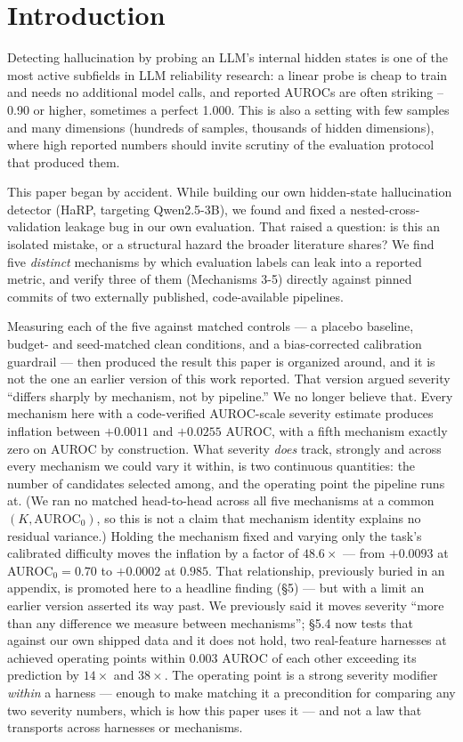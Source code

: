 \documentclass[10pt]{article} %
\begin{document}
\section{Introduction}

Detecting hallucination by probing an LLM's internal hidden states is one
of the most active subfields in LLM reliability research: a linear probe
is cheap to train and needs no additional model calls, and reported
AUROCs are often striking -- 0.90 or higher, sometimes a perfect 1.000.
This is also a setting with few samples and many dimensions (hundreds of
samples, thousands of hidden dimensions), where high reported numbers
should invite scrutiny of the evaluation protocol that produced them.

This paper began by accident. While building our own hidden-state
hallucination detector (HaRP, targeting Qwen2.5-3B), we found and fixed a
nested-cross-validation leakage bug in our own evaluation. That raised a
question: is this an isolated mistake, or a structural hazard the broader
literature shares? We find five \emph{distinct} mechanisms by which
evaluation labels can leak into a reported metric, and verify three of
them (Mechanisms 3-5) directly against pinned commits of two externally
published, code-available pipelines.

Measuring each of the five against matched controls --- a placebo baseline,
budget- and seed-matched clean conditions, and a bias-corrected calibration
guardrail --- then produced the result this paper is organized around, and it
is not the one an earlier version of this work reported. That version argued
severity ``differs sharply by mechanism, not by pipeline.'' We no longer
believe that. Every mechanism here with a code-verified AUROC-scale severity
estimate produces inflation between $+0.0011$ and $+0.0255$ AUROC, with a
fifth mechanism exactly zero on AUROC by construction. What severity
\emph{does} track, strongly and across every mechanism we could vary it
within, is two continuous quantities: the number of candidates selected among,
and the operating point the pipeline runs at. (We ran no matched head-to-head
across all five mechanisms at a common $(K,\text{AUROC}_0)$, so this is not a
claim that mechanism identity explains no residual variance.) Holding the mechanism fixed and varying
only the task's calibrated difficulty moves the inflation by a factor of
$48.6\times$ --- from $+0.0093$ at AUROC$_0=0.70$ to $+0.0002$ at $0.985$. That
relationship, previously buried in an appendix, is promoted here to a headline
finding (§5) --- but with a limit an earlier version asserted its way past. We
previously said it moves severity ``more than any difference we measure between
mechanisms''; §5.4 now tests that against our own shipped data and it does not
hold, two real-feature harnesses at achieved operating points within $0.003$
AUROC of each other exceeding its prediction by $14\times$ and $38\times$. The
operating point is a strong severity modifier \emph{within} a harness --- enough
to make matching it a precondition for comparing any two severity numbers,
which is how this paper uses it --- and not a law that transports across
harnesses or mechanisms.
\end{document}
